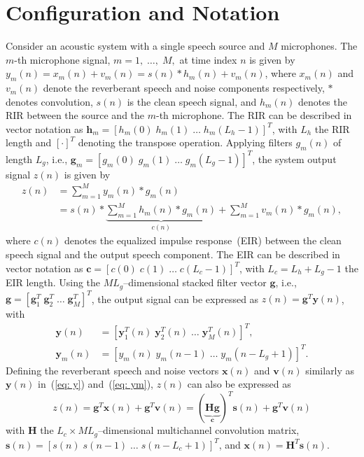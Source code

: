\documentclass{article}
\begin{document}
\section{Configuration and Notation}
\vspace{-0.2cm}
Consider an acoustic system with a single speech source and $M$ microphones.
The $m$-th microphone signal, $m = 1, \; \ldots, \; M,$ at time index $n$ is given by $y_m(n) =  x_m(n) + v_m(n) = s(n) \ast h_m(n) + v_m(n)$, where $x_m(n)$ and $v_m(n)$ denote the reverberant speech and noise components respectively, $\ast$ denotes convolution, $s(n)$ is the clean speech signal, and $h_m(n)$ denotes the RIR between the source and the $m$-th microphone.
The RIR can be described in vector notation as $\mathbf{h}_m = \left[h_m(0) \; h_m(1) \; \ldots \; h_m(L_h-1) \right]^T$, with $L_h$ the RIR length and $\left[\cdot \right]^T$ denoting the transpose operation.
Applying filters $g_m(n)$ of length $L_g$, i.e., $\mathbf{g}_m = \left[g_m(0) \; g_m(1) \; \ldots \; g_m(L_g-1) \right]^T$, the system output signal $z(n)$ is given by
\begin{align}
  z(n) & = \sum_{m=1}^{M} y_m(n) \ast g_m(n) \\
 & = s(n) \ast \underbrace{\sum_{m=1}^{M} h_m(n) \ast g_m(n)}_{c(n)} + \sum_{m=1}^{M} v_m(n) \ast g_m(n),
\end{align}
where $c(n)$ denotes the equalized impulse response~(EIR) between the clean speech signal and the output speech component.
The EIR can be described in vector notation as $\mathbf{c} = \left[c(0) \; c(1) \; \ldots \; c(L_c-1) \right]^{T}$, with $L_c = L_h+L_g-1$ the EIR length.
Using the $ML_g$--dimensional stacked filter vector $\mathbf{g}$, i.e., $\mathbf{g}  =  \left[\mathbf{g}_1^T \; \mathbf{g}_2^T \; \ldots \; \mathbf{g}_M^T \right]^T$, the output signal can be expressed as $z(n) = \mathbf{g}^T\mathbf{y}(n)$, with
\begin{align}
  \label{eq: y}
  \mathbf{y}(n) & = [\mathbf{y}_1^T(n) \; \mathbf{y}_2^T(n) \; \ldots \; \mathbf{y}_M^T(n)]^T, \\
  \label{eq: ym}
  \mathbf{y}_m(n) & = [y_m(n) \; y_m(n-1) \; \ldots \; y_m(n-L_g+1)] ^T.
\end{align}
Defining the reverberant speech and noise vectors $\mathbf{x}(n)$ and $\mathbf{v}(n)$ similarly as $\mathbf{y}(n)$ in~(\ref{eq: y}) and~(\ref{eq: ym}), $z(n)$ can also be expressed as
\begin{equation}
\boxed{z(n)  = \mathbf{g}^T \mathbf{x}(n) + \mathbf{g}^T \mathbf{v}(n) = (\underbrace{\mathbf{H}\mathbf{g}}_{\mathbf{c}})^T\mathbf{s}(n) + \mathbf{g}^T\mathbf{v}(n) }
\end{equation}
with $\mathbf{H}$ the $L_c \times ML_g$--dimensional multichannel convolution matrix, $\mathbf{s}(n)  = [s(n) \; s(n-1) \; \ldots \; s(n-L_c+1)]^T$, and $\mathbf{x}(n) = \mathbf{H}^T\mathbf{s}(n)$.
\end{document}
